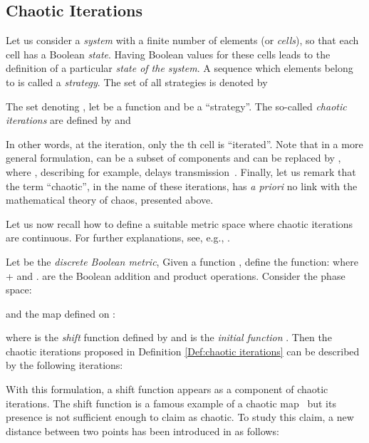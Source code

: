 \documentclass{article}
\begin{document}
\subsection{Chaotic Iterations}
\label{sec:chaotic iterations}


Let us consider  a \emph{system} with a finite  number  of elements  (or \emph{cells}), so that each  cell has a
Boolean  \emph{state}. Having  Boolean values for these
 cells  leads to the definition of a particular \emph{state  of the
system}. A sequence which  elements belong to  is called a \emph{strategy}. The set of all strategies is
denoted by 

\begin{definition}
\label{Def:chaotic iterations}
The      set             denoting      ,      let
 be
a  function  and    be  a  ``strategy''.  The  so-called
\emph{chaotic      iterations}     are     defined      by      and

\end{definition}

In other words, at the  iteration, only the th cell is
\textquotedblleft  iterated\textquotedblright .  Note  that in  a more
general  formulation,    can   be  a  subset  of  components  and
      can     be      replaced     by
, where  , describing for example,
delays  transmission~\cite{Robert1986,guyeux10}.  Finally,  let us  remark that
the term  ``chaotic'', in  the name of  these iterations,  has \emph{a
priori} no link with the mathematical theory of chaos, presented above.


Let us now recall how to define a suitable metric space where chaotic iterations
are continuous. For further explanations, see, e.g., \cite{guyeux10}.

Let  be the \emph{discrete Boolean metric},  Given a function , define the function:
\noindent where + and . are the Boolean addition and product operations.
Consider the phase space:

\noindent and the map defined on :

\noindent where  is the \emph{shift} function defined by  and  is the \emph{initial function} 
. Then the chaotic iterations proposed in
Definition \ref{Def:chaotic iterations} can be described by the following iterations:


With this formulation, a shift function appears as a component of chaotic
iterations. The shift function is a famous example of a chaotic
map~\cite{Devaney} but its presence is not sufficient enough to claim  as
chaotic. 
To study this claim, a new distance between two points  has been introduced in \cite{guyeux10} as follows:
\end{document}

